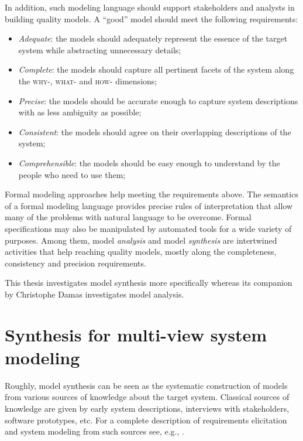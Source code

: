 In addition, such modeling language should support stakeholders and analysts in building quality models. A ``good'' model should meet the following requirements:

\begin{itemize}
\item \emph{Adequate}: the models should adequately represent the essence of the target system while abstracting unnecessary details;
\item \emph{Complete}: the models should capture all pertinent facets of the system along the \textsc{why-}, \textsc{what-} and \textsc{how-} dimensions;
\item \emph{Precise}: the models should be accurate enough to capture system descriptions with as less ambiguity as possible;
\item \emph{Consistent}: the models should agree on their overlapping descriptions of the system;
\item \emph{Comprehensible}: the models should be easy enough to understand by the people who need to use them;
\end{itemize}

Formal modeling approaches help meeting the requirements above. The semantics of a formal modeling language provides precise rules of interpretation that allow many of the problems with natural language to be overcome. Formal specifications may also be manipulated by automated tools for a wide variety of purposes. Among them, model \emph{analysis} and model \emph{synthesis} are intertwined activities that help reaching quality models, mostly along the completeness, consistency and precision requirements.

This thesis investigates model synthesis more specifically whereas its companion by Christophe Damas \cite{Damas:2011} investigates model analysis.

\section{Synthesis for multi-view system modeling}

Roughly, model synthesis can be seen as the systematic construction of models from various sources of knowledge about the target system. Classical sources of knowledge are given by early system descriptions, interviews with stakeholders, software prototypes, etc. For a complete description of requirements elicitation and system modeling from such sources see, e.g., \cite{VanLamsweerde:2009}.

